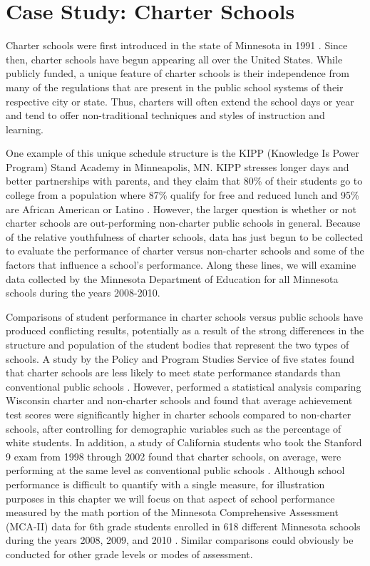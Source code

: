 \documentclass[
]{krantz}
\begin{document}
\hypertarget{cs:charter}{%
\section{Case Study: Charter Schools}\label{cs:charter}}

Charter schools were first introduced in the state of Minnesota in 1991 \citep{CharterSchools}. Since then, charter schools have begun appearing all over the United States. While publicly funded, a unique feature of charter schools is their independence from many of the regulations that are present in the public school systems of their respective city or state. Thus, charters will often extend the school days or year and tend to offer non-traditional techniques and styles of instruction and learning.

One example of this unique schedule structure is the KIPP (Knowledge Is Power Program) Stand Academy in Minneapolis, MN. KIPP stresses longer days and better partnerships with parents, and they claim that 80\% of their students go to college from a population where 87\% qualify for free and reduced lunch and 95\% are African American or Latino \citep{KIPP}. However, the larger question is whether or not charter schools are out-performing non-charter public schools in general. Because of the relative youthfulness of charter schools, data has just begun to be collected to evaluate the performance of charter versus non-charter schools and some of the factors that influence a school's performance. Along these lines, we will examine data collected by the Minnesota Department of Education for all Minnesota schools during the years 2008-2010.

Comparisons of student performance in charter schools versus public schools have produced conflicting results, potentially as a result of the strong differences in the structure and population of the student bodies that represent the two types of schools. A study by the Policy and Program Studies Service of five states found that charter schools are less likely to meet state performance standards than conventional public schools \citep{Finnigan2004}. However, \citet{Witte2007} performed a statistical analysis comparing Wisconsin charter and non-charter schools and found that average achievement test scores were significantly higher in charter schools compared to non-charter schools, after controlling for demographic variables such as the percentage of white students. In addition, a study of California students who took the Stanford 9 exam from 1998 through 2002 found that charter schools, on average, were performing at the same level as conventional public schools \citep{Buddin2005}. Although school performance is difficult to quantify with a single measure, for illustration purposes in this chapter we will focus on that aspect of school performance measured by the math portion of the Minnesota Comprehensive Assessment (MCA-II) data for 6th grade students enrolled in 618 different Minnesota schools during the years 2008, 2009, and 2010 \citep{MNDepartmentOfEducation}. Similar comparisons could obviously be conducted for other grade levels or modes of assessment.
\end{document}
